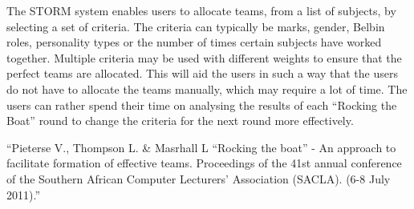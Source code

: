 The STORM system enables users to allocate teams, from a list of subjects, by selecting a set of criteria. The criteria can typically be marks, gender, Belbin roles, personality types or the number of times certain subjects have worked together. Multiple criteria may be used with different weights to ensure that the perfect teams are allocated. This will aid the users in such a way that the users do not have to allocate the teams manually, which may require a lot of time. The users can rather spend their time on analysing the results of each ``Rocking the Boat'' round to change the criteria for the next round more effectively.

\par

``Pieterse V., Thompson L. \& Masrhall L ``Rocking the boat'' - An approach to facilitate formation of effective teams. Proceedings of the 41st annual conference of the Southern African Computer Lecturers' Association (SACLA). (6-8 July 2011).''
